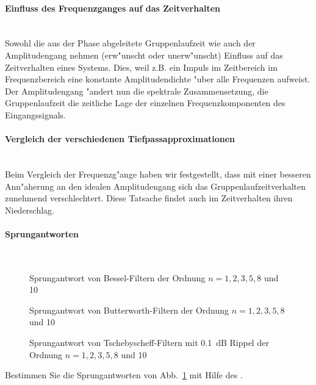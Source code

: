 \paragraph{Einfluss des Frequenzganges auf das Zeitverhalten}~\\
Sowohl die aus der Phase abgeleitete Gruppenlaufzeit wie auch der
Amplitudengang nehmen (erw"unscht oder unerw"unscht) Einfluss auf das
Zeitverhalten eines Systems. Dies, weil z.B. ein Impuls im Zeitbereich im
Frequenzbereich eine konstante Amplitudendichte "uber alle Frequenzen
aufweist. Der Amplitudengang "andert nun die spektrale Zusammensetzung, die
Gruppenlaufzeit die zeitliche Lage der einzelnen Frequenzkomponenten des
Eingangssignals.

\paragraph{Vergleich der verschiedenen Tiefpassapproximationen}~\\
Beim Vergleich der Frequenzg"ange haben wir
festgestellt, dass mit einer besseren Ann"aherung an den idealen
Amplitudengang sich das Gruppenlaufzeitverhalten zunehmend
verschlechtert. Diese Tatsache findet auch im Zeitverhalten ihren
Niederschlag.\\
\newpage
\paragraph{Sprungantworten}~\\
\begin{figure}[!htb]%
\vspace*{-3mm}
\begin{center}
  \caption{Sprungantwort von Bessel-Filtern der Ordnung $n=1,2,3,5,8$ und 10}
\end{center}
\vspace*{-6mm}
\end{figure}

\begin{figure}[!htb]
\vspace*{-3mm}
\begin{center}
  \caption{Sprungantwort von Butterworth-Filtern der Ordnung $n=1,2,3,5,8$ und 10}
\end{center}
\vspace*{-6mm}
\end{figure}
\newpage
\begin{figure}[!htb] %
\begin{center}
  \caption{Sprungantwort von Tschebyscheff-Filtern mit 0.1~dB Rippel der Ordnung $n=1,2,3,5,8$ und 10}\label{FIL_ABB_SPRUNG_tscheby}
\end{center}
\vspace*{-9mm}
\end{figure}
\aufg
Bestimmen Sie die Sprungantworten von Abb.~\ref{FIL_ABB_SPRUNG_tscheby} mit Hilfe des .
